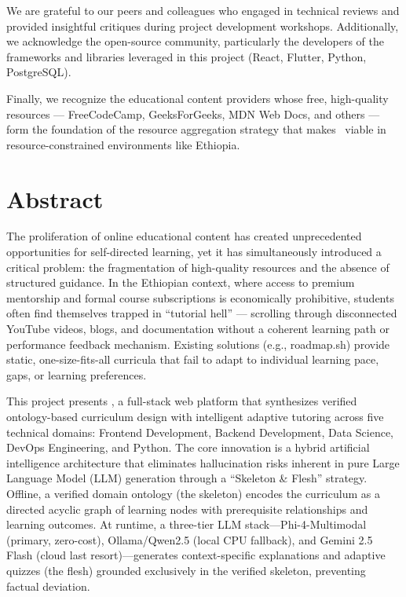 \documentclass[11pt,a4paper,twoside]{report}
\begin{document}
We are grateful to our peers and colleagues who engaged in technical reviews and provided insightful critiques during project development workshops. Additionally, we acknowledge the open-source community, particularly the developers of the frameworks and libraries leveraged in this project (React, Flutter, Python, PostgreSQL).

Finally, we recognize the educational content providers whose free, high-quality resources --- FreeCodeCamp, GeeksForGeeks, MDN Web Docs, and others --- form the foundation of the resource aggregation strategy that makes \projectname\ viable in resource-constrained environments like Ethiopia.

\chapter*{Abstract}

The proliferation of online educational content has created unprecedented opportunities for self-directed learning, yet it has simultaneously introduced a critical problem: the fragmentation of high-quality resources and the absence of structured guidance. In the Ethiopian context, where access to premium mentorship and formal course subscriptions is economically prohibitive, students often find themselves trapped in \enquote{tutorial hell} --- scrolling through disconnected YouTube videos, blogs, and documentation without a coherent learning path or performance feedback mechanism. Existing solutions (e.g., roadmap.sh) provide static, one-size-fits-all curricula that fail to adapt to individual learning pace, gaps, or learning preferences.

This project presents \projectname, a full-stack web platform that synthesizes verified ontology-based curriculum design with intelligent adaptive tutoring across five technical domains: Frontend Development, Backend Development, Data Science, DevOps Engineering, and Python. The core innovation is a hybrid artificial intelligence architecture that eliminates hallucination risks inherent in pure Large Language Model (LLM) generation through a \enquote{Skeleton \& Flesh} strategy. Offline, a verified domain ontology (the skeleton) encodes the curriculum as a directed acyclic graph of learning nodes with prerequisite relationships and learning outcomes. At runtime, a three-tier LLM stack---Phi-4-Multimodal (primary, zero-cost), Ollama/Qwen2.5 (local CPU fallback), and Gemini 2.5 Flash (cloud last resort)---generates context-specific explanations and adaptive quizzes (the flesh) grounded exclusively in the verified skeleton, preventing factual deviation.
\end{document}

